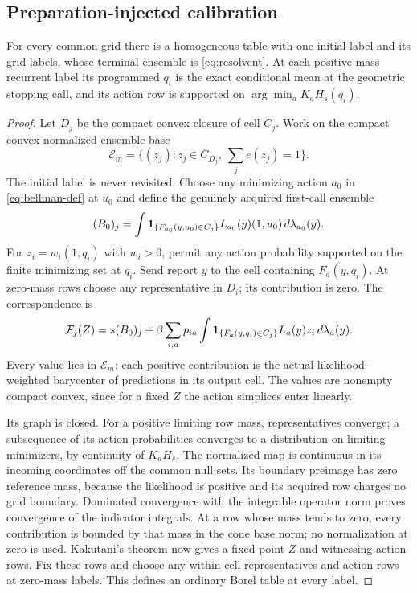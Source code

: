 \subsection{Preparation-injected calibration}
\begin{lemma}\label{lem:calibration}
For every common grid there is a homogeneous table with one initial label and its grid labels, whose terminal ensemble is \eqref{eq:resolvent}. At each positive-mass recurrent label its programmed $q_i$ is the exact conditional mean at the geometric stopping call, and its action row is supported on $\arg\min_aK_aH_s(q_i)$.
\end{lemma}
\begin{proof}
Let $D_j$ be the compact convex closure of cell $C_j$. Work on the compact convex normalized ensemble base
\[
 \mathcal E_m=\{(z_j):z_j\in C_{D_j},\ \sum_j e(z_j)=1\}.
\]
The initial label is never revisited. Choose any minimizing action $a_0$ in \eqref{eq:bellman-def} at $u_0$ and define the genuinely acquired first-call ensemble
\[
 (B_0)_j=\int\mathbf 1_{\{F_{a_0}(y,u_0)\in C_j\}}
                   L_{a_0}(y)(1,u_0)\,d\lambda_{a_0}(y).
\]
For $z_i=w_i(1,q_i)$ with $w_i>0$, permit any action probability supported on the finite minimizing set at $q_i$. Send report $y$ to the cell containing $F_a(y,q_i)$. At zero-mass rows choose any representative in $D_i$; its contribution is zero. The correspondence is
\begin{equation}\label{eq:correspondence}
 \mathcal F_j(Z)=s(B_0)_j+
 \beta\sum_{i,a}p_{ia}\int\mathbf 1_{\{F_a(y,q_i)\in C_j\}}
                                      L_a(y)z_i\,d\lambda_a(y).
\end{equation}
Every value lies in $\mathcal E_m$: each positive contribution is the actual likelihood-weighted barycenter of predictions in its output cell. The values are nonempty compact convex, since for a fixed $Z$ the action simplices enter linearly.

Its graph is closed. For a positive limiting row mass, representatives converge; a subsequence of its action probabilities converges to a distribution on limiting minimizers, by continuity of $K_aH_s$. The normalized map is continuous in its incoming coordinates off the common null sets. Its boundary preimage has zero reference mass, because the likelihood is positive and its acquired row charges no grid boundary. Dominated convergence with the integrable operator norm proves convergence of the indicator integrals. At a row whose mass tends to zero, every contribution is bounded by that mass in the cone base norm; no normalization at zero is used. Kakutani's theorem \cite{Kakutani1941} now gives a fixed point $Z$ and witnessing action rows. Fix these rows and choose any within-cell representatives and action rows at zero-mass labels. This defines an ordinary Borel table at every label.


\end{proof}
